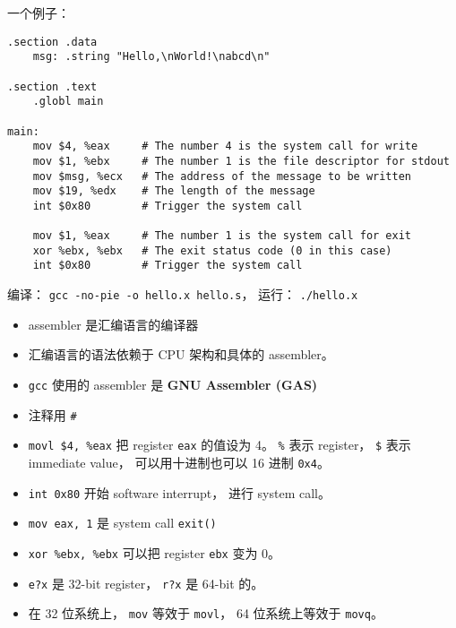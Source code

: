 
\begin{issues}
\issueDraft
\end{issues}

一个例子：
\begin{lstlisting}[language=none]
.section .data
    msg: .string "Hello,\nWorld!\nabcd\n"

.section .text
    .globl main

main:
    mov $4, %eax     # The number 4 is the system call for write
    mov $1, %ebx     # The number 1 is the file descriptor for stdout
    mov $msg, %ecx   # The address of the message to be written
    mov $19, %edx    # The length of the message
    int $0x80        # Trigger the system call

    mov $1, %eax     # The number 1 is the system call for exit
    xor %ebx, %ebx   # The exit status code (0 in this case)
    int $0x80        # Trigger the system call
\end{lstlisting}

编译： \verb|gcc -no-pie -o hello.x hello.s|， 运行： \verb|./hello.x|

\begin{itemize}
\item assembler 是汇编语言的编译器
\item 汇编语言的语法依赖于 CPU 架构和具体的 assembler。
\item \verb|gcc| 使用的 assembler 是 \textbf{GNU Assembler (GAS)}
\item 注释用 \verb|#|
\item \verb|movl $4, %eax| 把 register \verb|eax| 的值设为 4。 \verb|%| 表示 register， \verb|$| 表示 immediate value， 可以用十进制也可以 16 进制 \verb|0x4|。
\item \verb|int 0x80| 开始 software interrupt， 进行 system call。
\item \verb|mov eax, 1| 是 system call \verb|exit()|
\item \verb|xor %ebx, %ebx| 可以把 register \verb|ebx| 变为 0。
\item \verb|e?x| 是 32-bit register， \verb|r?x| 是 64-bit 的。
\item 在 32 位系统上， \verb|mov| 等效于 \verb|movl|， 64 位系统上等效于 \verb|movq|。
\end{itemize}
